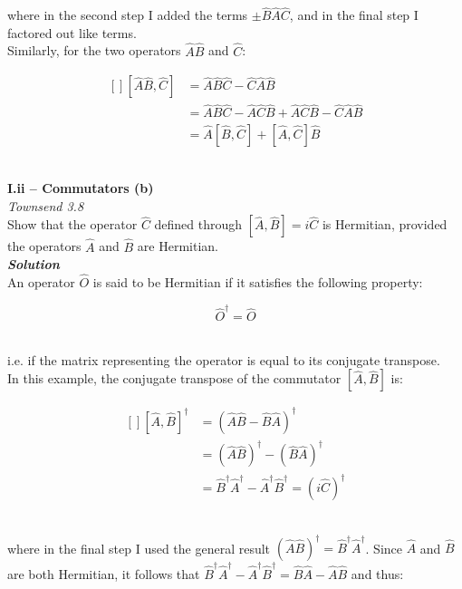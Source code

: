 \documentclass[9pt]{extarticle}
\newcommand{\bfit}[1]{\textbf{\textit{#1}}}
\begin{document}
\begin{multicols*}{2}
where in the second step I added the terms $\pm \hat B \hat A \hat C$, and in the final step I factored out like terms. \\ 

Similarly, for the two operators $\hat A \hat B$ and $\hat C$:

$$
\begin{aligned}[]
	[\hat A \hat B, \hat C] &= \hat A \hat B \hat C - \hat C \hat A \hat B \\ 
	&= \hat A \hat B \hat C - \hat A \hat C \hat B + \hat A \hat C \hat B - \hat C \hat A \hat B \\ 
	&= \hat A [\hat B, \hat C] + [\hat A, \hat C] \hat B
\end{aligned}	
$$ \ 





\hrulefill 

\hfill

{\bf \LARGE I.ii -- Commutators (b)} \\ 

{\it Townsend 3.8} \\
Show that the operator $\hat C$ defined through $[\hat A, \hat B] = i \hat C$ is Hermitian, provided the operators $\hat A$ and $\hat B$ are Hermitian. \\ 

{\bfit{Solution}} \\
An operator $\hat O$ is said to be Hermitian if it satisfies the following property:

$$\hat O^\dagger = \hat O$$ \ 

i.e. if the matrix representing the operator is equal to its conjugate transpose. \\ 

In this example, the conjugate transpose of the commutator $[\hat A, \hat B]$ is:

$$
\begin{aligned}[]
	[\hat A, \hat B]^\dagger &= (\hat A \hat B - \hat B \hat A)^\dagger \\ 
	&= (\hat A \hat B)^\dagger - (\hat B \hat A)^\dagger \\ 
	&= \hat B^\dagger \hat A^\dagger - \hat A^\dagger \hat B^\dagger = (i\hat C)^\dagger
\end{aligned}
$$ \ 

where in the final step I used the general result $(\hat A \hat B)^\dagger = \hat B^\dagger \hat A^\dagger$. Since $\hat A$ and $\hat B$ are both Hermitian, it follows that $\hat B^\dagger \hat A^\dagger - \hat A^\dagger \hat B^\dagger = \hat B \hat A - \hat A \hat B$ and thus: 


\end{multicols*}
\end{document}
